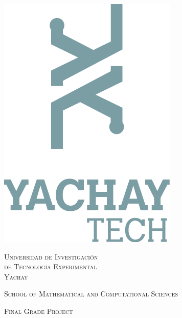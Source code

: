 \documentclass[10pt]{article}
\begin{document}
\begin{center}
\begin{minipage}{0.48\textwidth}
\begin{flushleft}
  \end{flushleft}\end{minipage}
  \begin{minipage}{0.48\textwidth} \begin{flushright}
    \includegraphics[scale = 0.75]{images/yachaytech}
  \end{flushright}\end{minipage}

  \vspace*{-2.5cm}
  \textsc{\huge Universidad de Investigaci\'on \\
  \vspace{5px} de Tecnolog\'ia Experimental \\
  \vspace{10px} Yachay}\\

  \vspace*{1.5cm}

  \textsc{\LARGE School of Mathematical and Computational Sciences}\\[1.5cm]

  \begin{minipage}{0.9\textwidth} 
    \begin{center}
      \textsc{\LARGE Final Grade Project}
    \end{center}
  \end{minipage}\\[0.5cm]
  

\end{center}
\end{document}
